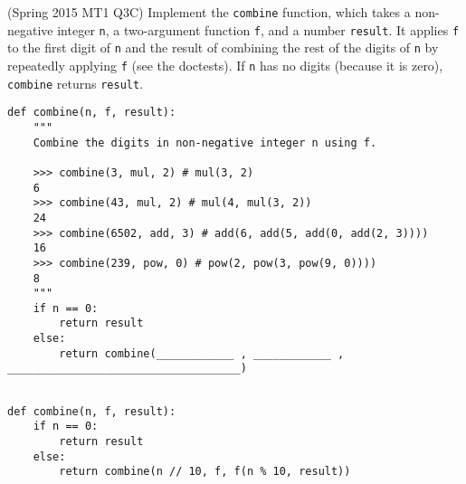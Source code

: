 \begin{blocksection}
\question (Spring 2015 MT1 Q3C) Implement the \lstinline$combine$ function, which takes a non-negative integer
\lstinline$n$, a two-argument function \lstinline$f$, and a number \lstinline$result$. It applies
\lstinline$f$ to the first digit of \lstinline$n$ and the result of combining the rest of the digits of \lstinline$n$
by repeatedly applying \lstinline$f$ (see the doctests). If \lstinline$n$ has no digits (because it is zero),
\lstinline$combine$ returns \lstinline$result$.

\begin{lstlisting}
def combine(n, f, result):
    """
    Combine the digits in non-negative integer n using f.
    
    >>> combine(3, mul, 2) # mul(3, 2)
    6
    >>> combine(43, mul, 2) # mul(4, mul(3, 2))
    24
    >>> combine(6502, add, 3) # add(6, add(5, add(0, add(2, 3))))
    16
    >>> combine(239, pow, 0) # pow(2, pow(3, pow(9, 0))))
    8
    """
    if n == 0:
        return result
    else:
        return combine(____________ , ____________ , ____________________________________)
    
\end{lstlisting}

\begin{solution}[1.5in]
\begin{lstlisting}
def combine(n, f, result):
    if n == 0:
        return result
    else:
        return combine(n // 10, f, f(n % 10, result))
\end{lstlisting}
\end{solution}
\end{blocksection}
